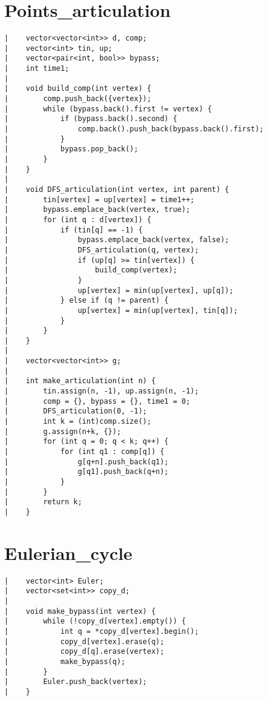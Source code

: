 \documentclass[a4paper, 10pt]{article}
\begin{document}
\begin{center}
\section*{Points\_articulation}
\begin{verbatim}
|    vector<vector<int>> d, comp;
|    vector<int> tin, up;
|    vector<pair<int, bool>> bypass;
|    int time1;
|    
|    void build_comp(int vertex) {
|        comp.push_back({vertex});
|        while (bypass.back().first != vertex) {
|            if (bypass.back().second) {
|                comp.back().push_back(bypass.back().first);
|            }
|            bypass.pop_back();
|        }
|    }
|    
|    void DFS_articulation(int vertex, int parent) {
|        tin[vertex] = up[vertex] = time1++;
|        bypass.emplace_back(vertex, true);
|        for (int q : d[vertex]) {
|            if (tin[q] == -1) {
|                bypass.emplace_back(vertex, false);
|                DFS_articulation(q, vertex);
|                if (up[q] >= tin[vertex]) {
|                    build_comp(vertex);
|                }
|                up[vertex] = min(up[vertex], up[q]);
|            } else if (q != parent) {
|                up[vertex] = min(up[vertex], tin[q]);
|            }
|        }
|    }
|    
|    vector<vector<int>> g;
|    
|    int make_articulation(int n) {
|        tin.assign(n, -1), up.assign(n, -1);
|        comp = {}, bypass = {}, time1 = 0;
|        DFS_articulation(0, -1);
|        int k = (int)comp.size();
|        g.assign(n+k, {});
|        for (int q = 0; q < k; q++) {
|            for (int q1 : comp[q]) {
|                g[q+n].push_back(q1);
|                g[q1].push_back(q+n);
|            }
|        }
|        return k;
|    }
\end{verbatim}

\section*{Eulerian\_cycle}
\begin{verbatim}
|    vector<int> Euler;
|    vector<set<int>> copy_d;
|    
|    void make_bypass(int vertex) {
|        while (!copy_d[vertex].empty()) {
|            int q = *copy_d[vertex].begin();
|            copy_d[vertex].erase(q);
|            copy_d[q].erase(vertex);
|            make_bypass(q);
|        }
|        Euler.push_back(vertex);
|    }
\end{verbatim}


\end{center}
\end{document}

